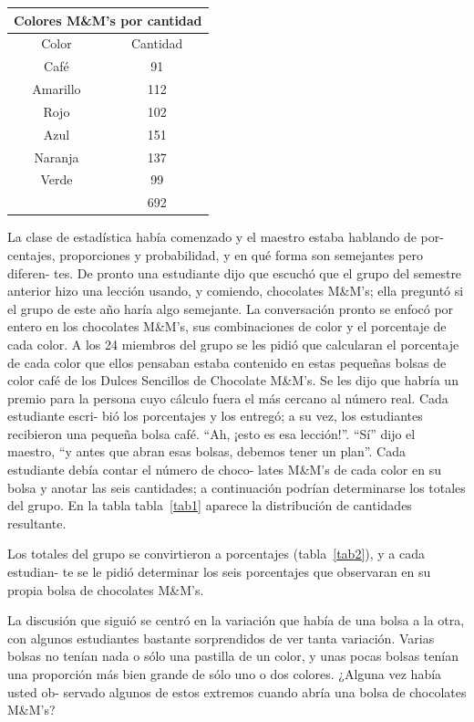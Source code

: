 \documentclass[10pt,twoside]{article}
\begin{document}
\begin{minipage}{0.35\textwidth}
\begin{tabular}{c|c}
\multicolumn{2}{c}{Colores M\&M's por cantidad} \\ \hline
Color & Cantidad \\ \hline
Café & 91 \\ 
Amarillo & 112 \\ 
Rojo & 102 \\ 
Azul & 151 \\ 
Naranja & 137 \\ 
Verde & 99 \\ \cline{2-2}
 & 692 \\ 
\hline 
\end{tabular}
\end{minipage}\hfill
\begin{minipage}{.6\textwidth}
La clase de estadística había comenzado y el maestro estaba hablando de por-
centajes, proporciones y probabilidad, y en qué forma son semejantes pero diferen-
tes. De pronto una estudiante dijo que escuchó que el grupo del semestre anterior
hizo una lección usando, y comiendo, chocolates M\&M’s; ella preguntó si el grupo
de este año haría algo semejante. La conversación pronto se enfocó por entero en
los chocolates M\&M’s, sus combinaciones de color y el porcentaje de cada color. A
los 24 miembros del grupo se les pidió que calcularan el porcentaje de cada color
que ellos pensaban estaba contenido en estas pequeñas bolsas de color café de los
Dulces Sencillos de Chocolate M\&M’s. Se les dijo que habría un premio para la
persona cuyo cálculo fuera el más cercano al número real. Cada estudiante escri-
bió los porcentajes y los entregó; a su vez, los estudiantes recibieron una pequeña
bolsa café. “Ah, ¡esto es esa lección!”. “Sí” dijo el maestro, “y antes que abran esas
bolsas, debemos tener un plan”. Cada estudiante debía contar el número de choco-
lates M\&M's de cada color en su bolsa y anotar las seis cantidades; a continuación
podrían determinarse los totales del grupo. En la tabla tabla~\ref{tab1} aparece la distribución
de cantidades resultante.
\end{minipage} 

Los totales del grupo se convirtieron a porcentajes (tabla~\ref{tab2}), y a cada estudian-
te se le pidió determinar los seis porcentajes que observaran en su propia bolsa de
chocolates M\&M's.

La discusión que siguió se centró en la variación que había de una bolsa a la
otra, con algunos estudiantes bastante sorprendidos de ver tanta variación. Varias
bolsas no tenían nada o sólo una pastilla de un color, y unas pocas bolsas tenían una
proporción más bien grande de sólo uno o dos colores. ¿Alguna vez había usted ob-
servado algunos de estos extremos cuando abría una bolsa de chocolates M\&M's?
\end{document}
